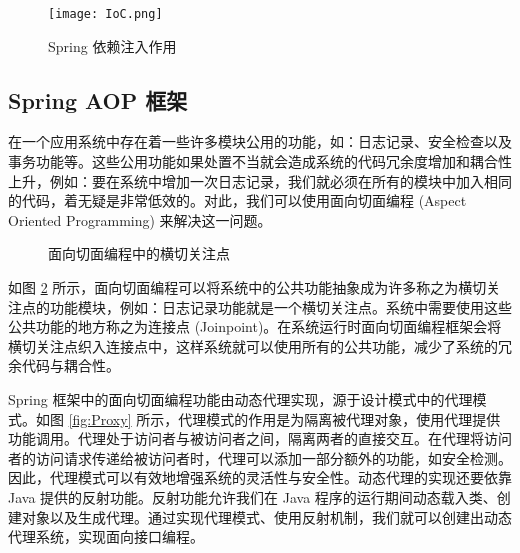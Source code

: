 \begin{figure}[!ht]
    \centering
    \texttt{[image: IoC.png]}
    \caption{Spring 依赖注入作用}
    \label{fig:DI}
\end{figure}

\subsection{Spring AOP 框架}

在一个应用系统中存在着一些许多模块公用的功能，如：日志记录、安全检查以及事务功能等。这些公用功能如果处置不当就会造成系统的代码冗余度增加和耦合性上升，例如：要在系统中增加一次日志记录，我们就必须在所有的模块中加入相同的代码，着无疑是非常低效的。对此，我们可以使用面向切面编程 (Aspect Oriented Programming) 来解决这一问题。


\begin{figure}[!ht]
    \centering
    \caption{面向切面编程中的横切关注点}
    \label{fig:AOP}
\end{figure}

如图 \ref{fig:AOP} 所示，面向切面编程可以将系统中的公共功能抽象成为许多称之为横切关注点的功能模块，例如：日志记录功能就是一个横切关注点。系统中需要使用这些公共功能的地方称之为连接点 (Joinpoint)\cite{walls2005spring}。在系统运行时面向切面编程框架会将横切关注点织入连接点中，这样系统就可以使用所有的公共功能，减少了系统的冗余代码与耦合性。

Spring 框架中的面向切面编程功能由动态代理实现，源于设计模式中的代理模式。如图 \ref{fig:Proxy} 所示，代理模式的作用是为隔离被代理对象，使用代理提供功能调用\cite{gamma1995design}。代理处于访问者与被访问者之间，隔离两者的直接交互。在代理将访问者的访问请求传递给被访问者时，代理可以添加一部分额外的功能，如安全检测。因此，代理模式可以有效地增强系统的灵活性与安全性。动态代理的实现还要依靠 Java 提供的反射功能。反射功能允许我们在 Java 程序的运行期间动态载入类、创建对象以及生成代理。通过实现代理模式、使用反射机制，我们就可以创建出动态代理系统，实现面向接口编程\cite{walls2005spring,walls2016spring}。

